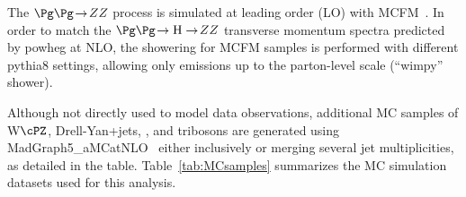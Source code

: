 The $\Pg\Pg \! \to \! ZZ$ process is simulated at leading order (LO) 
with MCFM~\cite{MCFM,Campbell:2013una}. In order to match the 
$\Pg\Pg \! \to \mathrm{H} \to \! ZZ$ transverse momentum spectra predicted 
by {\sc powheg} at NLO, the showering for MCFM samples is performed with 
different {\sc pythia8} settings, allowing only emissions up to the parton-level scale
(``wimpy'' shower).

Although not directly used to model data observations, additional 
MC samples of W$\cPZ$, Drell-Yan+jets, \ttbar, and tribosons are
generated using {\sc MadGraph5\_aMCatNLO}~\cite{Alwall:2014hca} either
inclusively or merging several jet multiplicities, as detailed in the table.
Table~\ref{tab:MCsamples} summarizes the MC simulation datasets used for this analysis. 

\begin{table}
\begin{footnotesize}
    \centering
{}
\end{footnotesize}
\end{table}
